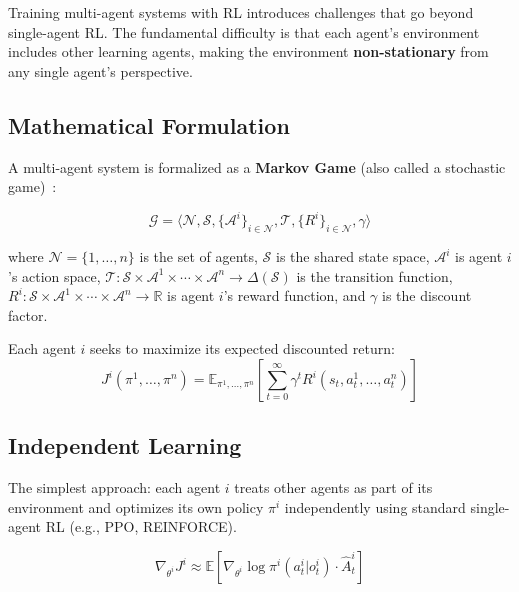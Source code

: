 Training multi-agent systems with RL introduces challenges that go beyond single-agent RL. The fundamental difficulty is that each agent’s environment includes other learning agents, making the environment \textbf{non-stationary} from any single agent’s perspective.

\subsection{Mathematical Formulation}
\label{mathematical-formulation}

A multi-agent system is formalized as a \textbf{Markov Game} (also called a stochastic game)~\cite{shapley1953stochastic}:

\begin{equation}
  \mathcal{G} = \langle \mathcal{N}, \mathcal{S}, \{\mathcal{A}^i\}_{i \in \mathcal{N}}, \mathcal{T}, \{R^i\}_{i \in \mathcal{N}}, \gamma \rangle
\end{equation}

where $\mathcal{N} = \{1, \ldots, n\}$ is the set of agents, $\mathcal{S}$ is the shared state space, $\mathcal{A}^i$ is agent $i$’s action space, $\mathcal{T}: \mathcal{S} \times \mathcal{A}^1 \times \cdots \times \mathcal{A}^n \to \Delta(\mathcal{S})$ is the transition function, $R^i: \mathcal{S} \times \mathcal{A}^1 \times \cdots \times \mathcal{A}^n \to \mathbb{R}$ is agent $i$’s reward function, and $\gamma$ is the discount factor.

Each agent $i$ seeks to maximize its expected discounted return: 
\begin{equation}
  J^i(\pi^1, \ldots, \pi^n) = \mathbb{E}_{\pi^1,\ldots,\pi^n}\left[\sum_{t=0}^{\infty} \gamma^t R^i(s_t, a_t^1, \ldots, a_t^n)\right]
\end{equation}

\subsection{Independent Learning}
\label{independent-learning}

The simplest approach: each agent $i$ treats other agents as part of its environment and optimizes its own policy $\pi^i$ independently using standard single-agent RL (e.g., PPO, REINFORCE).

\begin{equation}
  \nabla_{\theta^i} J^i \approx \mathbb{E}\left[\nabla_{\theta^i} \log \pi^i(a^i_t | o^i_t) \cdot \hat{A}^i_t\right]
\end{equation}

